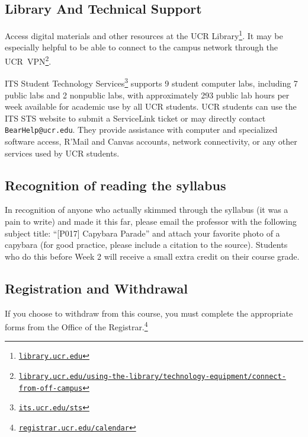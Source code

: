 \documentclass[12pt]{article}
\newcommand{\footlink}[1]{\footnote{\href{https://#1}{\texttt{#1}}}}
\newcommand{\UCR}{\acro{UCR}\xspace}
\newcommand\acro[1]{{\small {#1}}}
\numberwithin{equation}{section}    %
\begin{document}
\subsection{Library And Technical Support}

Access digital materials and other resources at the \UCR Library\footlink{library.ucr.edu}. It may be especially helpful to be able to connect to the campus network through the \UCR~\acro{VPN}\footlink{library.ucr.edu/using-the-library/technology-equipment/connect-from-off-campus}.

\acro{ITS} Student Technology Services\footlink{its.ucr.edu/sts} supports 9 student computer labs, including 7 public labs and 2 nonpublic labs, with approximately 293 public lab hours per week available for academic use by all \UCR students. \UCR students can use the \acro{ITS STS} website to submit a ServiceLink ticket or may directly contact \texttt{BearHelp@ucr.edu}. They provide assistance with computer and specialized software access, R'Mail and Canvas accounts, network connectivity, or any other services used by \UCR students.

\subsection{Recognition of reading the syllabus}

In recognition of anyone who actually skimmed through the syllabus (it was a pain to write) and made it this far, please email the professor with the following subject title: ``[P017] Capybara Parade'' and attach your favorite photo of a capybara (for good practice, please include a citation to the source). Students who do this before Week 2 will receive a small extra credit on their course grade.

\subsection{Registration and Withdrawal}

If you choose to withdraw from this course, you must complete the appropriate forms from the Office of the Registrar.\footlink{registrar.ucr.edu/calendar}
\end{document}
